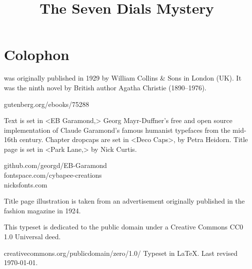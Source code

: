 \documentclass[
paper=5.5in:8.5in,
]{scrbook} %
\title{The Seven Dials Mystery}
\begin{document}
\frontmatter

\pagestyle{plain}
\tableofcontents
\clearpage


\mainmatter
\pagestyle{headings}
\renewcommand*{\chapterpagestyle}{plain}






































\clearpage
{}
\chapter*{Colophon}
\centering
\begin{minipage}{\textwidth}
 was originally published in 1929 by William Collins \& Sons in London (UK). It was the ninth novel by British author Agatha Christie (1890--1976).
\end{minipage}
\vfill
gutenberg.org/ebooks/75288
\vfill
\divider
\vfill
\begin{minipage}{\textwidth}
Text is set in <EB Garamond,> Georg Mayr-Duffner's free and open source implementation of Claude Garamond’s famous humanist typefaces from the mid-16th century.  Chapter dropcaps are set in <Deco Caps>, by Petra Heidorn. Title page is set in <Park Lane,> by Nick Curtis.
\end{minipage}
\vfill
 github.com/georgd/EB-Garamond\\fontspace.com/cybapee-creations\\nicksfonts.com
 \vfill
\divider
\vfill
\begin{minipage}{\textwidth}
Title page illustration is taken from an advertisement originally published in the fashion magazine  in 1924.
\end{minipage}
\vfill
\divider
\vfill
\begin{minipage}{\textwidth}
This typeset is dedicated to the public domain under a Creative Commons CC0 1.0 Universal deed. 
\end{minipage}
\vfill
creativecommons.org/publicdomain/zero/1.0/
\vfill
\divider
\vfill
Typeset in \LaTeX{}. Last revised \today.
\thispagestyle{empty}
\end{document}
